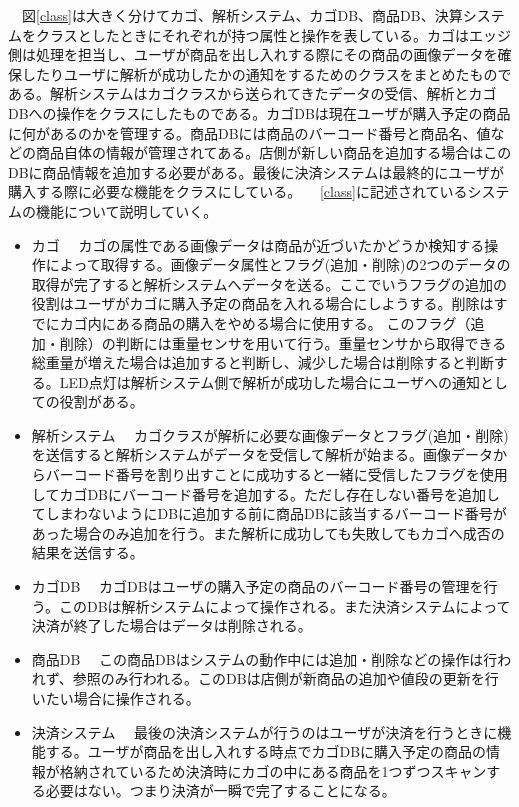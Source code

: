 　図\ref{class}は大きく分けてカゴ、解析システム、カゴDB、商品DB、決算システムをクラスとしたときにそれぞれが持つ属性と操作を表している。カゴはエッジ側は処理を担当し、ユーザが商品を出し入れする際にその商品の画像データを確保したりユーザに解析が成功したかの通知をするためのクラスをまとめたものである。解析システムはカゴクラスから送られてきたデータの受信、解析とカゴDBへの操作をクラスにしたものである。カゴDBは現在ユーザが購入予定の商品に何があるのかを管理する。商品DBには商品のバーコード番号と商品名、値などの商品自体の情報が管理されてある。店側が新しい商品を追加する場合はこのDBに商品情報を追加する必要がある。最後に決済システムは最終的にユーザが購入する際に必要な機能をクラスにしている。
　\ref{class}に記述されているシステムの機能について説明していく。
\begin{itemize}
\item カゴ
　カゴの属性である画像データは商品が近づいたかどうか検知する操作によって取得する。画像データ属性とフラグ(追加・削除)の2つのデータの取得が完了すると解析システムへデータを送る。ここでいうフラグの追加の役割はユーザがカゴに購入予定の商品を入れる場合にしようする。削除はすでにカゴ内にある商品の購入をやめる場合に使用する。
このフラグ（追加・削除）の判断には重量センサを用いて行う。重量センサから取得できる総重量が増えた場合は追加すると判断し、減少した場合は削除すると判断する。LED点灯は解析システム側で解析が成功した場合にユーザへの通知としての役割がある。
\item 解析システム
　カゴクラスが解析に必要な画像データとフラグ(追加・削除)を送信すると解析システムがデータを受信して解析が始まる。画像データからバーコード番号を割り出すことに成功すると一緒に受信したフラグを使用してカゴDBにバーコード番号を追加する。ただし存在しない番号を追加してしまわないようにDBに追加する前に商品DBに該当するバーコード番号があった場合のみ追加を行う。また解析に成功しても失敗してもカゴへ成否の結果を送信する。
\item カゴDB
　カゴDBはユーザの購入予定の商品のバーコード番号の管理を行う。このDBは解析システムによって操作される。また決済システムによって決済が終了した場合はデータは削除される。
\item 商品DB
　この商品DBはシステムの動作中には追加・削除などの操作は行われず、参照のみ行われる。このDBは店側が新商品の追加や値段の更新を行いたい場合に操作される。
\item 決済システム
　最後の決済システムが行うのはユーザが決済を行うときに機能する。ユーザが商品を出し入れする時点でカゴDBに購入予定の商品の情報が格納されているため決済時にカゴの中にある商品を1つずつスキャンする必要はない。つまり決済が一瞬で完了することになる。
\end{itemize}


